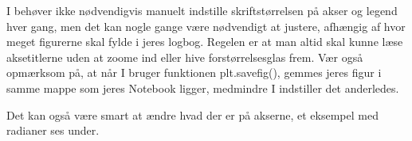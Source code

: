 \documentclass[letterpaper,10pt,english]{jupyterBook}
\begin{document}
\begin{sphinxVerbatim}[commandchars=\\\{\}]
   

      

    
   

   

 

 
\end{sphinxVerbatim}

\noindent{}

I behøver ikke nødvendigvis manuelt indstille skriftstørrelsen på akser og legend hver gang, men det kan nogle gange være nødvendigt at justere, afhængig af hvor meget figurerne skal fylde i jeres logbog. Regelen er at man altid skal kunne læse akse\sphinxhyphen{}titlerne uden at zoome ind eller hive forstørrelsesglas frem. Vær også opmærksom på, at når I bruger funktionen plt.savefig(), gemmes jeres figur i samme mappe som jeres Notebook ligger, medmindre I indstiller det anderledes.

Det kan også være smart at ændre hvad der er på akserne, et eksempel med radianer ses under.
\end{document}
